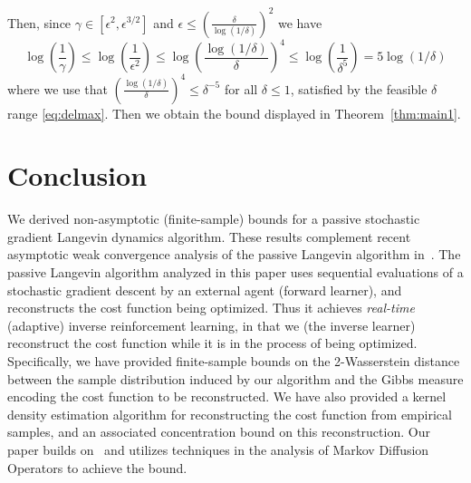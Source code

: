 \documentclass[journal,onecolumn]{IEEEtran}
\newcommand{\step}{\epsilon}
\newcommand{\wass}{\mathcal{W}_2}
\newcommand{\gibbs}{\ids_{\infty}}
\newcommand{\dtlaw}{\ids_{k}} %
\newcommand{\ctlaw}{\nu_{k\step}}
\newcommand{\ids}{\pi}
\newcommand{\idw}{\gamma}
\newcommand{\ksp}{k,\idw}
\begin{document}
{Then, since $\idw \in [ \step^2, \step^{3/2}]$ and $\step \leq \left(\frac{\delta}{\log(1/\delta)} \right)^2$ we have 
 \[\log(\frac{1}{\idw}) \leq \log\left(\frac{1}{\step^2}\right) \leq \log\left(\frac{\log(1/\delta)}{\delta}\right)^4 \leq \log\left(\frac{1}{ \delta^5}\right) = 5\log\left(1/\delta \right)\]
 where we use that $\left(\frac{\log(1/\delta)}{\delta}\right)^4 \leq \delta^{-5} $ for all $\delta\leq 1$, satisfied by the feasible $\delta$ range \eqref{eq:delmax}. 
Then we obtain the bound displayed in Theorem~\ref{thm:main1}. 


\section{Conclusion}
\label{sec:conc}
We derived non-asymptotic (finite-sample) bounds for a passive stochastic gradient Langevin dynamics algorithm. These results complement recent asymptotic weak convergence analysis of the passive Langevin algorithm in~\cite{krishnamurthy2021langevin}. The passive Langevin algorithm analyzed in this paper uses sequential evaluations of a stochastic gradient descent by an external agent (forward learner), and reconstructs the cost function being optimized. Thus it achieves \textit{real-time} (adaptive) inverse reinforcement learning, in that we (the inverse learner) reconstruct the cost function while it is in the process of being optimized. Specifically, we have provided finite-sample bounds on the 2-Wasserstein distance between the sample distribution induced by our algorithm and the Gibbs measure encoding the cost function to be reconstructed. {\color{black}We have also provided a kernel density estimation algorithm for reconstructing the cost function from empirical samples, and an associated concentration bound on this reconstruction.} Our paper builds on~\cite{raginsky2017non} and utilizes techniques in the analysis of Markov Diffusion Operators \cite{bakry2014analysis} to achieve the bound.

}
\end{document}
